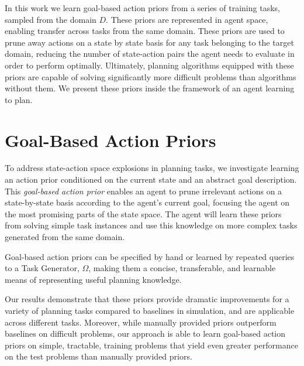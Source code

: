 \documentclass[11pt]{article}
\begin{document}
In this work we learn goal-based action priors from a series of training tasks, sampled from the domain $D$. These priors are represented in agent space, enabling transfer across tasks from the same domain. These priors are used to prune away actions on a state by state basis for any task belonging to the target domain, reducing the number of state-action pairs the agent needs to evaluate in order to perform optimally. Ultimately, planning algorithms equipped with these priors are capable of solving significantly more difficult problems than algorithms without them. We present these priors inside the framework of an agent learning to plan.

\section{Goal-Based Action Priors}
\label{sec:gbaps}

To address state-action space explosions in planning tasks,
we investigate learning an action prior conditioned on the current state and an abstract goal description. This {\it goal-based action prior}
enables an agent to prune irrelevant actions on a
state-by-state basis according to the agent's current goal, focusing the agent on
the most promising parts of the state space. The agent will learn these priors from solving simple task instances and use this knowledge on more complex tasks generated from the same domain.
 
Goal-based action priors can be specified by hand or learned by repeated queries to a Task Generator, $\Omega$, making them a concise, transferable, and learnable means of representing useful planning knowledge. 

Our results demonstrate
that these priors provide dramatic improvements for a variety of
planning tasks compared to baselines in simulation, and are applicable
across different tasks.  Moreover, while manually provided
priors outperform baselines on difficult problems, our approach
is able to learn goal-based action priors on simple, tractable, 
training problems that yield even greater performance on the test problems
than manually provided priors.
\end{document}
